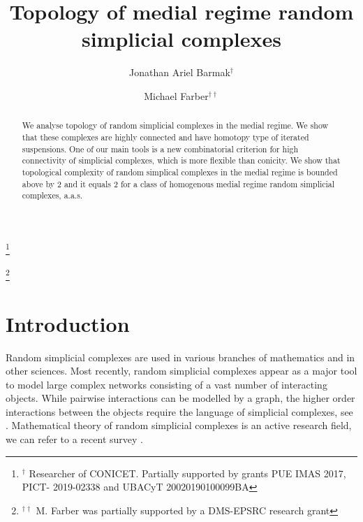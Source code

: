 \documentclass[11pt,twoside, reqno]{amsart}
\theoremstyle{plain}
\theoremstyle{definition}
\begin{document}
\title{Topology of medial regime random simplicial complexes }


\author[J.A. Barmak]{Jonathan Ariel Barmak$^{\dagger}$}

\thanks{$^{\dagger}$ Researcher of CONICET. Partially supported by grants PUE IMAS 2017, PICT-
2019-02338 and UBACyT 20020190100099BA}

\address{Universidad de Buenos Aires. Facultad de Ciencias Exactas y Naturales. Departamento de Matem\'atica. Buenos Aires, Argentina.}

\author[M. Farber]{Michael Farber$^{\dagger\dagger}$}

\thanks{$^{\dagger\dagger}$ M. Farber was partially supported by a DMS-EPSRC research grant}

\address{School of Mathematical Sciences, Queen Mary University of London, London, UK}



\begin{abstract} 
We analyse topology of random simplicial complexes in the medial regime.
We show that these complexes are highly connected and have homotopy type of iterated suspensions. 
One of our main tools is a new combinatorial criterion for high connectivity of simplicial complexes, which is more flexible than conicity. 
We show that topological complexity of random simplical complexes in the medial regime is bounded above by $2$ and it equals $2$ for a class of homogenous medial regime random simplicial complexes, a.a.s. 
\end{abstract}







\maketitle


\section{Introduction}
Random simplicial complexes are used in various branches of mathematics and in other sciences. Most recently, random simplicial complexes appear as a major tool to model large complex networks consisting of a vast number of interacting objects. While pairwise interactions
can be modelled by a graph, the higher order interactions between the objects
require the language of simplicial complexes, see \cite{Bat}.
Mathematical theory of random simplicial complexes is an active research field, we can refer to a recent survey \cite{BK}. 
\end{document}
